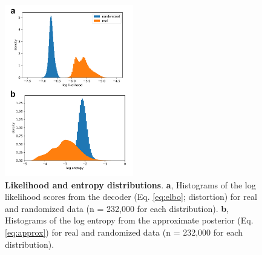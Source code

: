 \begin{figure}[!htb]
\begin{center}
    \includegraphics[width=0.5\textwidth]{Graving_IMPRS_Thesis/figures/likelihood_entropy_figure.pdf}
\end{center}

\caption{  \textbf{Likelihood and entropy distributions}. \textbf{a}, Histograms of the log likelihood scores from the decoder (Eq. \ref{eq:elbo}; distortion) for real and randomized data (n = 232,000 for each distribution). \textbf{b}, Histograms of the log entropy from the approximate posterior (Eq. \ref{eq:approx}) for real and randomized data (n = 232,000 for each distribution).}

\label{fig:likelihood_entropy_figure} %

\end{figure}

